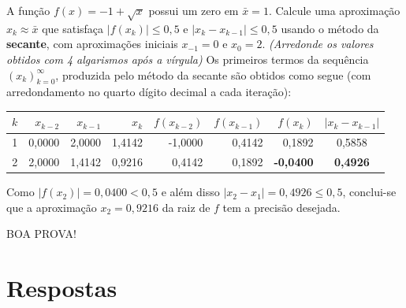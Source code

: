 \documentclass[12pt,a4paper]{article}
\begin{document}
\begin{ExerciseList}
\Exercise[title={2,0}] A função $f(x) = -1 + \sqrt{x}$ possui um zero em $\bar{x} = 1$. Calcule uma aproximação $x_k \approx \bar{x}$ que satisfaça $|f(x_k)| \leq 0,5$ e $|x_k - x_{k-1}| \leq 0,5$ usando o método da \textbf{secante}, com aproximações iniciais $x_{-1} = 0$ e $x_0 = 2$.
{\color{blue} \textit{(Arredonde os valores obtidos com 4 algarismos após a vírgula)}}
\Answer
Os primeiros termos da sequência $(x_k)_{k=0}^\infty$, produzida pelo método da secante são obtidos como segue (com arredondamento no quarto dígito decimal a cada iteração):
\medskip
\begin{center}
\begin{tabular}{rrrrrrrc}
\hline
$k$ & $x_{k-2}$ & $x_{k-1}$ & $x_k$ & $f(x_{k-2})$ & $f(x_{k-1})$ & $f(x_k)$ & $|x_k - x_{k-1}|$ \\
\hline
1 & 0,0000 & 2,0000 & 1,4142 & -1,0000 & 0,4142 & 0,1892 & 0,5858 \\
2 & 2,0000 & 1,4142 & 0,9216 & 0,4142 & 0,1892 & \textbf{-0,0400} & \textbf{0,4926} \\
\hline
\end{tabular}
\end{center}
\medskip
Como $|f(x_2)| = 0,0400 < 0,5$ e além disso $|x_2 - x_1| = 0,4926 \leq 0,5$, conclui-se que a aproximação $x_2 = 0,9216$ da raiz de $f$ tem a precisão desejada.
\end{ExerciseList}

\vspace{0.5cm}
\begin{center}
BOA PROVA!
\end{center}

\newpage
\restoregeometry
\section*{Respostas}
\shipoutAnswer
\end{document}
